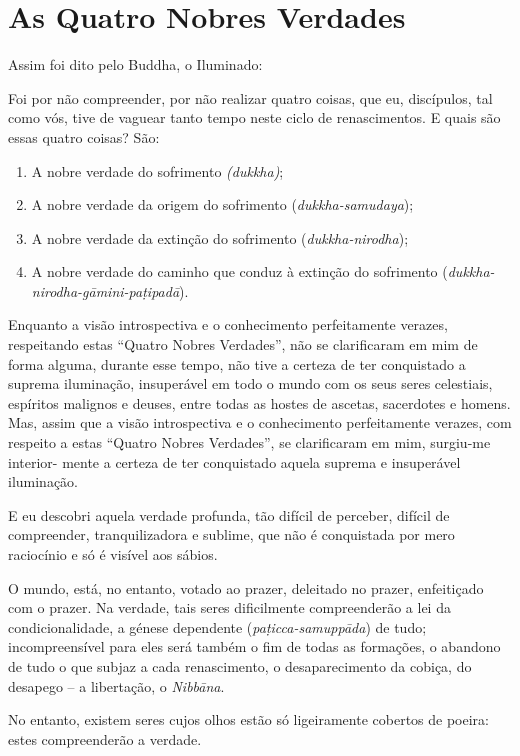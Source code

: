 \chapter{As Quatro Nobres Verdades}

Assim foi dito pelo Buddha, o Iluminado:

Foi por não compreender, por não realizar quatro coisas, que eu, discípulos, tal
como vós, tive de vaguear tanto tempo neste ciclo de renascimentos. E quais são
essas quatro coisas? São:

\begin{enumerate}
  \item A nobre verdade do sofrimento \emph{(dukkha)};

  \item A nobre verdade da origem do sofrimento (\emph{dukkha-samudaya});

  \item A nobre verdade da extinção do sofrimento (\emph{dukkha-nirodha});

  \item A nobre verdade do caminho que conduz à extinção do sofrimento (\emph{dukkha-nirodha-gāmini-paṭipadā}).
\end{enumerate}


Enquanto a visão introspectiva e o conhecimento perfeitamente verazes,
respeitando estas ``Quatro Nobres Verdades'', não se clarificaram em mim de
forma alguma, durante esse tempo, não tive a certeza de ter conquistado a
suprema iluminação, insuperável em todo o mundo com os seus seres celestiais,
espíritos malignos e deuses, entre todas as hostes de ascetas, sacerdotes e
homens. Mas, assim que a visão introspectiva e o conhecimento perfeitamente
verazes, com respeito a estas ``Quatro Nobres Verdades'', se clarificaram em
mim, surgiu-me interior- mente a certeza de ter conquistado aquela suprema e
insuperável iluminação.


E eu descobri aquela verdade profunda, tão difícil de perceber, difícil de
compreender, tranquilizadora e sublime, que não é conquistada por mero
raciocínio e só é visível aos sábios.


O mundo, está, no entanto, votado ao prazer, deleitado no prazer, enfeitiçado
com o prazer. Na verdade, tais seres dificilmente compreenderão a lei da
condicionalidade, a génese dependente (\emph{paṭicca-samuppāda}) de tudo;
incompreensível para eles será também o fim de todas as formações, o abandono de
tudo o que subjaz a cada renascimento, o desaparecimento da cobiça, do desapego
-- a libertação, o \emph{Nibbāna}.

No entanto, existem seres cujos olhos estão só ligeiramente cobertos de poeira:
estes compreenderão a verdade.

